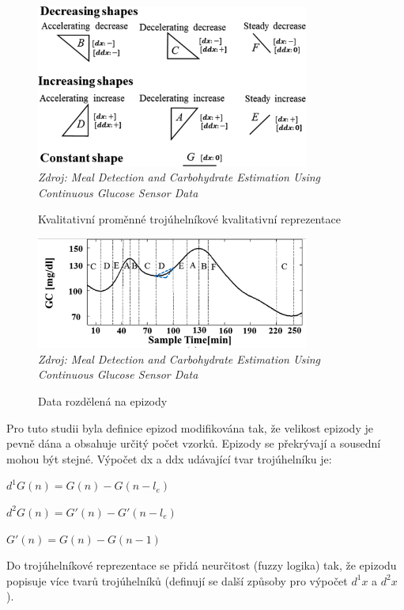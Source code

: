 \begin{figure}[H]
\caption{Kvalitativní proměnné trojúhelníkové kvalitativní reprezentace}
\label{fig:analyza:wavelet1}
\centering
\includegraphics[width=0.8\textwidth]{img/analyzaCHO/wavelet1.png}\\
\textit{Zdroj: Meal Detection and Carbohydrate Estimation Using Continuous Glucose Sensor Data \citep{analyzaCHO.WaveletEst}}
\end{figure}
\begin{figure}[H]
\caption{Data rozdělená na epizody}
\label{fig:analyza:wavelet2}
\centering
\includegraphics[width=0.8\textwidth]{img/analyzaCHO/wavelet2.png}\\
\textit{Zdroj: Meal Detection and Carbohydrate Estimation Using Continuous Glucose Sensor Data \citep{analyzaCHO.WaveletEst}}
\end{figure}

Pro tuto studii byla definice epizod modifikována tak, že velikost epizody je pevně dána a obsahuje určitý počet vzorků. Epizody se překrývají a sousední mohou být stejné. Výpočet dx a ddx udávající tvar trojúhelníku je:

$d^{1}G(n)=G(n)-G(n-l_{e})$

$d^{2}G(n)=G'(n)-G'(n-l_{e})$

$G'(n)=G(n)-G(n-1)$

Do trojúhelníkové reprezentace se přidá neurčitost (fuzzy logika) tak, že epizodu popisuje více tvarů trojúhelníků (definují se další způsoby pro výpočet $d^1x$ a $d^2x$).

